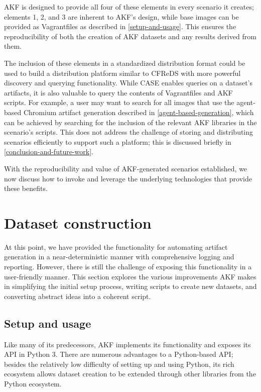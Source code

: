 \documentclass[final,5p,times,twocolumn]{elsarticle}
\begin{document}
AKF is designed to provide all four of these elements in every scenario
it creates; elements 1, 2, and 3 are inherent to AKF's design, while
base images can be provided as Vagrantfiles as described in
\autoref{setup-and-usage}. This ensures the reproducibility of both the
creation of AKF datasets and any results derived from them.

The inclusion of these elements in a standardized distribution format
could be used to build a distribution platform similar to CFReDS with
more powerful discovery and querying functionality. While CASE enables
queries on a dataset's artifacts, it is also valuable to query the
contents of Vagrantfiles and AKF scripts. For example, a user may want
to search for all images that use the agent-based Chromium artifact
generation described in \autoref{agent-based-generation}, which can be
achieved by searching for the inclusion of the relevant AKF libraries in
the scenario's scripts. This does not address the challenge of storing
and distributing scenarios efficiently to support such a platform; this
is discussed briefly in \autoref{conclusion-and-future-work}.

With the reproducibility and value of AKF-generated scenarios
established, we now discuss how to invoke and leverage the underlying
technologies that provide these benefits.

\section{Dataset construction}\label{dataset-construction}

At this point, we have provided the functionality for automating
artifact generation in a near-deterministic manner with comprehensive
logging and reporting. However, there is still the challenge of exposing
this functionality in a user-friendly manner. This section explores the
various improvements AKF makes in simplifying the initial setup process,
writing scripts to create new datasets, and converting abstract ideas
into a coherent script.

\subsection{Setup and usage}\label{setup-and-usage}

Like many of its predecessors, AKF implements its functionality and
exposes its API in Python 3. There are numerous advantages to a
Python-based API; besides the relatively low difficulty of setting up
and using Python, its rich ecosystem allows dataset creation to be
extended through other libraries from the Python ecosystem.
\end{document}
